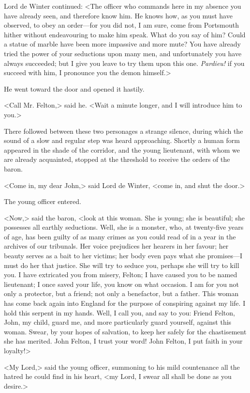 Lord de Winter continued: <The officer who commands here in my absence you have already seen, and therefore know him. He knows how, as you must have observed, to obey an order---for you did not, I am sure, come from Portsmouth hither without endeavouring to make him speak. What do you say of him? Could a statue of marble have been more impassive and more mute? You have already tried the power of your seductions upon many men, and unfortunately you have always succeeded; but I give you leave to try them upon this one. \textit{Pardieu!} if you succeed with him, I pronounce you the demon himself.> 

He went toward the door and opened it hastily. 

<Call Mr. Felton,> said he. <Wait a minute longer, and I will introduce him to you.> 

There followed between these two personages a strange silence, during which the sound of a slow and regular step was heard approaching. Shortly a human form appeared in the shade of the corridor, and the young lieutenant, with whom we are already acquainted, stopped at the threshold to receive the orders of the baron. 

<Come in, my dear John,> said Lord de Winter, <come in, and shut the door.> 

The young officer entered. 

<Now,> said the baron, <look at this woman. She is young; she is beautiful; she possesses all earthly seductions. Well, she is a monster, who, at twenty-five years of age, has been guilty of as many crimes as you could read of in a year in the archives of our tribunals. Her voice prejudices her hearers in her favour; her beauty serves as a bait to her victims; her body even pays what she promises---I must do her that justice. She will try to seduce you, perhaps she will try to kill you. I have extricated you from misery, Felton; I have caused you to be named lieutenant; I once saved your life, you know on what occasion. I am for you not only a protector, but a friend; not only a benefactor, but a father. This woman has come back again into England for the purpose of conspiring against my life. I hold this serpent in my hands. Well, I call you, and say to you: Friend Felton, John, my child, guard me, and more particularly guard yourself, against this woman. Swear, by your hopes of salvation, to keep her safely for the chastisement she has merited. John Felton, I trust your word! John Felton, I put faith in your loyalty!> 

<My Lord,> said the young officer, summoning to his mild countenance all the hatred he could find in his heart, <my Lord, I swear all shall be done as you desire.> 

